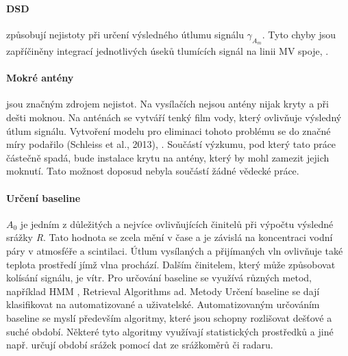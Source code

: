 \documentclass[a4paper,12pt,oneside]{report}
\begin{document}
\paragraph*{DSD} způsobují nejistoty při určení výsledného útlumu
signálu \emph{$\gamma_{A_{m}} $}. Tyto chyby jsou zapříčiněny
integrací jednotlivých úseků tlumících signál na linii MV
spoje, \cite{mv1}.

\paragraph*{Mokré antény}jsou značným zdrojem nejistot. Na vysílačích
nejsou antény nijak kryty a při dešti moknou. Na anténách se vytváří
tenký film vody, který ovlivňuje výsledný útlum signálu. Vytvoření
modelu pro eliminaci tohoto problému se do značné míry podařilo
(Schleiss et al., 2013), \cite{wetat}. Součástí výzkumu, pod který tato
práce částečně spadá, bude instalace krytu na antény, který by mohl
zamezit jejich moknutí. Tato možnost doposud nebyla součástí žádné
vědecké práce.

\paragraph*{Určení baseline } \emph{ $A_{0}$ } je jedním z důležitých
a nejvíce ovlivňujících činitelů při výpočtu výsledné srážky
\emph{R}. Tato hodnota se zcela mění v čase a je závislá na
koncentraci vodní páry v atmosféře a scintilaci. Útlum vysílaných a
přijímaných vln ovlivňuje také teplota prostředí jímž vlna
prochází. Dalším činitelem, který může způsobovat kolísání signálu, je
vítr.  Pro určování baseline se využívá různých metod, například
   \acs{HMM} \cite{comparsinmv}, Retrieval Algorithms
\cite{countryw} ad. Metody Určení baseline se dají klasifikovat na
automatizované a uživatelské. Automatizovaným určováním baseline se
myslí především algoritmy, které jsou schopny rozlišovat dešťové a suché
období. Některé tyto algoritmy využívají statistických prostředků a
jiné např. určují období srážek pomocí dat ze srážkoměrů
\cite{countryw} či radaru.
\end{document}
